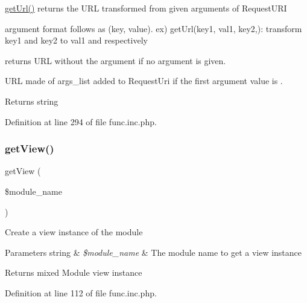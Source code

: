 \hyperlink{func_8inc_8php_accd14bda49a1044b4d8dd93f020f11ee}{get\+Url()} returns the U\+RL transformed from given arguments of Request\+U\+RI 
\begin{DoxyEnumerate}
\item argument format follows as (key, value). ex) get\+Url(\textquotesingle{}key1\textquotesingle{}, \textquotesingle{}val1\textquotesingle{}, \textquotesingle{}key2\textquotesingle{},\textquotesingle{}\textquotesingle{})\+: transform key1 and key2 to val1 and \textquotesingle{}\textquotesingle{} respectively 
\item returns U\+RL without the argument if no argument is given. 
\item U\+RL made of args\+\_\+list added to Request\+Uri if the first argument value is \textquotesingle{}\textquotesingle{}. 
\end{DoxyEnumerate}

\begin{DoxyReturn}{Returns}
string 
\end{DoxyReturn}


Definition at line 294 of file func.\+inc.\+php.

\mbox{\label{func_8inc_8php_a49d537fc2c7b51ab5d7b7c6672b21ce3}} 
\subsubsection{\texorpdfstring{get\+View()}{getView()}}
{\footnotesize\ttfamily get\+View (\begin{DoxyParamCaption}\item[{}]{\$module\+\_\+name }\end{DoxyParamCaption})}

Create a view instance of the module


\begin{DoxyParams}[1]{Parameters}
string & {\em \$module\+\_\+name} & The module name to get a view instance \\
\hline
\end{DoxyParams}
\begin{DoxyReturn}{Returns}
mixed Module view instance 
\end{DoxyReturn}


Definition at line 112 of file func.\+inc.\+php.

\mbox{\label{func_8inc_8php_a0d8de97888953b480d02a9c9d845a64c}} 
